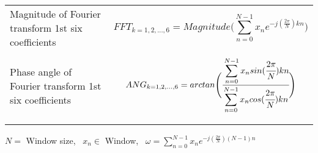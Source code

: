 \begin{table}[!htbp]
{\begin{tabular}{m{7cm}m{7.5cm}}
        Magnitude of Fourier transform 1st six coefficients & \[FFT_{k=1,2,...,6} = Magnitude\bigg(\sum_{n=0}^{N-1}x_n e^{-j(\frac{2\pi}{N})kn}\bigg)\]\\
        
        Phase angle of Fourier transform 1st six coefficients & \[ANG_{k=1,2,...,6} = arctan\Bigg(\cfrac{\displaystyle\sum\limits_{n=0}^{N-1}x_n sin{(\cfrac{2\pi}{N})kn}}{\displaystyle\sum\limits_{n=0}^{N-1}x_n cos{(\cfrac{2\pi}{N})kn}}\Bigg)\]\\

            
        \bottomrule 
        

    \label{tab:features}
  \end{tabular}
  }

\footnotesize $N =$ {Window size,} \, $x_n \in$ {Window,} \, $\omega = \sum_{n=0}^{N-1}x_n e^{-j(\frac{2\pi}{N})(N-1)n}$
\end{table}